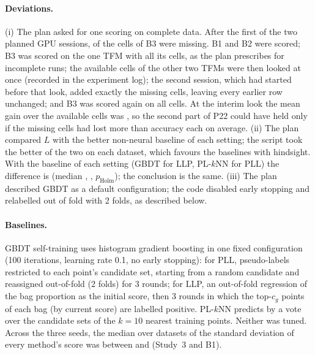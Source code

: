 \paragraph{Deviations.} (i) The plan asked for one scoring on complete data. After the first of the two planned GPU
sessions,  of the  cells of B3 were missing. B1 and B2 were scored; B3 was scored on
the one TFM with all its cells, as the plan prescribes for incomplete runs; the  available cells of
the other two TFMs were then looked at once (recorded in the experiment log); the second session, which had started
before that look, added exactly the missing cells, leaving every earlier row unchanged; and B3 was scored again on all
 cells. At the interim look the mean gain over the available cells was , so the
second part of P22 could have held only if the missing cells had lost more than  accuracy each
on average. (ii) The plan compared $L$ with the better non-neural baseline of each setting; the script took the better
of the two on each dataset, which favours the baselines with hindsight. With the baseline of each setting (GBDT for LLP,
PL-$k$NN for PLL) the difference is  (median ,
, $p_{\mathrm{Holm}}$); the conclusion is the same. (iii) The plan
described GBDT as a default configuration; the code disabled early stopping and relabelled out of fold with 2 folds,
as described below.

\paragraph{Baselines.} GBDT self-training uses histogram gradient boosting in one fixed configuration (100 iterations,
learning rate 0.1, no early stopping): for PLL, pseudo-labels restricted to each point's candidate set, starting from a
random candidate and reassigned out-of-fold (2 folds) for 3 rounds; for LLP, an out-of-fold regression of the bag
proportion as the initial score, then 3 rounds in which the top-$c_g$ points of each bag (by current score) are
labelled positive. PL-$k$NN \citep{hullermeier2006plknn} predicts by a vote over the candidate sets of the $k=10$
nearest training points. Neither was tuned. Across the three seeds, the median over datasets of the standard deviation
of every method's score was between  and  (Study~3 and B1).

